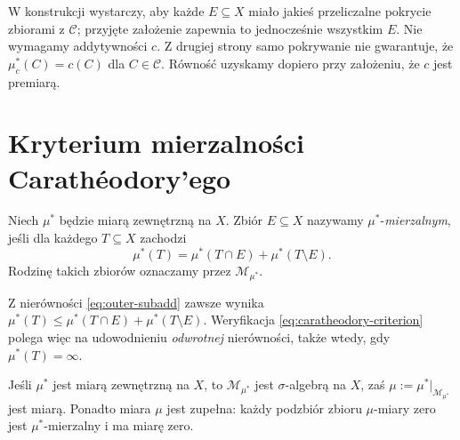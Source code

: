 \begin{uwaga}
W konstrukcji wystarczy, aby każde $E\subseteq X$ miało jakieś
przeliczalne pokrycie zbiorami z $\mathcal C$; przyjęte założenie
zapewnia to jednocześnie wszystkim $E$. Nie wymagamy addytywności $c$.
Z drugiej strony samo pokrywanie nie gwarantuje, że
$\mu_c^*(C)=c(C)$ dla $C\in\mathcal C$.
Równość uzyskamy dopiero przy założeniu, że $c$ jest premiarą.
\end{uwaga}

\section{Kryterium mierzalności Carathéodory'ego}

\begin{definicja}
\label{def:caratheodory-measurable}
Niech $\mu^*$ będzie miarą zewnętrzną na $X$. Zbiór $E\subseteq X$
nazywamy $\mu^*$-\emph{mierzalnym}, jeśli dla każdego $T\subseteq X$
zachodzi
\begin{equation}\label{eq:caratheodory-criterion}
\mu^*(T)=\mu^*(T\cap E)+\mu^*(T\setminus E).
\end{equation}
Rodzinę takich zbiorów oznaczamy przez $\mathcal M_{\mu^*}$.
\end{definicja}

Z nierówności \eqref{eq:outer-subadd} zawsze wynika
$\mu^*(T)\le\mu^*(T\cap E)+\mu^*(T\setminus E)$.
Weryfikacja \eqref{eq:caratheodory-criterion} polega więc na
udowodnieniu \emph{odwrotnej} nierówności, także wtedy, gdy
$\mu^*(T)=\infty$.

\begin{twierdzenie}
\label{thm:caratheodory}
Jeśli $\mu^*$ jest miarą zewnętrzną na $X$, to
$\mathcal M_{\mu^*}$ jest $\sigma$-algebrą na $X$, zaś
$\mu:=\mu^*|_{\mathcal M_{\mu^*}}$ jest miarą. Ponadto miara
$\mu$ jest zupełna: każdy podzbiór zbioru $\mu$-miary zero jest
$\mu^*$-mierzalny i ma miarę zero.
\end{twierdzenie}

